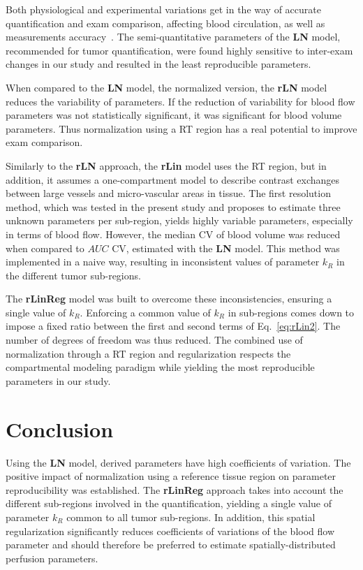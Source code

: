 Both physiological and experimental variations get in the way of accurate quantification and exam comparison, affecting blood circulation, as well as measurements accuracy~\cite{Tang:2011fja}.
The semi-quantitative parameters of the \textbf{LN} model, recommended for tumor quantification, were found highly sensitive to inter-exam changes in our study and resulted in the least reproducible parameters. 
 
When compared to the \textbf{LN} model, the normalized version, the \textbf{rLN} model reduces the variability of parameters. If the reduction of variability for blood flow parameters was not statistically significant, it was significant for blood volume parameters. Thus normalization using a RT region has a real potential to improve exam comparison.

Similarly to the \textbf{rLN} approach, the \textbf{rLin} model uses the RT region, but in addition, it assumes a one-compartment model to describe contrast exchanges between large vessels and micro-vascular areas in tissue.
The first resolution method, which was tested in the present study and proposes to estimate three unknown parameters per sub-region, yields highly variable parameters, especially in terms of blood flow. However, the median CV of blood volume was  reduced when compared to  $AUC$ CV, estimated with the \textbf{LN} model.
This method was implemented in a naive way, resulting in inconsistent values of parameter $k_R$ in the different tumor sub-regions. 

The \textbf{rLinReg} model was built to overcome these inconsistencies, ensuring a single value of $k_R$.
Enforcing a common value of $k_R$ in sub-regions comes down to impose a fixed ratio between the first and second terms of Eq.~\ref{eq:rLin2}.
The number of degrees of freedom was thus reduced. 
The combined use of normalization through a RT region and regularization respects the compartmental modeling paradigm while yielding the most reproducible parameters in our study.

\section{Conclusion}

Using the \textbf{LN} model, derived parameters have high coefficients of variation. 
The positive impact of normalization using a reference tissue region on parameter reproducibility was established. 
The \textbf{rLinReg} approach takes into account the different sub-regions involved in the quantification, yielding a single value of parameter $k_R$ common to all tumor sub-regions. 
In addition, this spatial regularization significantly reduces coefficients of variations of the blood flow parameter and should therefore be preferred to estimate spatially-distributed perfusion parameters.